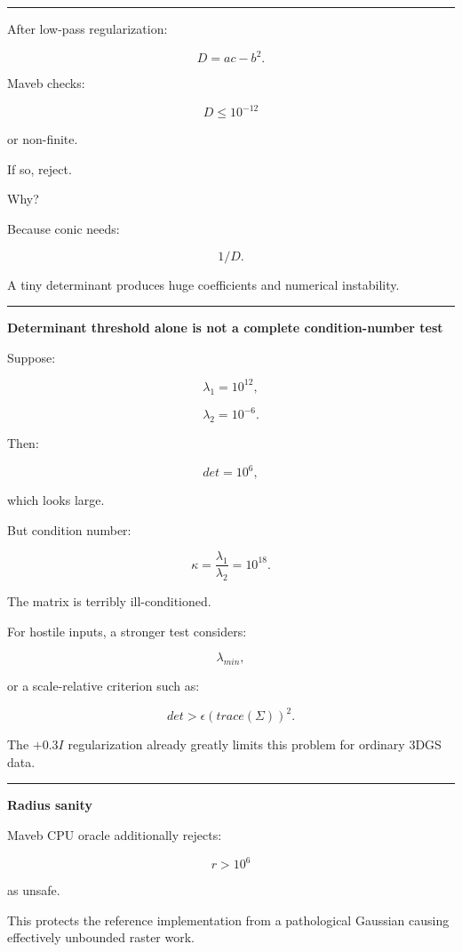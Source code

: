 \begin{center}\rule{0.5\linewidth}{0.5pt}\end{center}

After low-pass regularization:

\[
D=
ac-b^2.
\]

Maveb checks:

\[
D\le10^{-12}
\]

or non-finite.

If so, reject.

Why?

Because conic needs:

\[
1/D.
\]

A tiny determinant produces huge coefficients and numerical instability.

\begin{center}\rule{0.5\linewidth}{0.5pt}\end{center}

\textbf{Determinant threshold alone is not a complete condition-number test}

Suppose:

\[
\lambda_1=10^{12},
\]

\[
\lambda_2=10^{-6}.
\]

Then:

\[
det=
10^6,
\]

which looks large.

But condition number:

\[
\kappa=
\frac{\lambda_1}{\lambda_2}
=
10^{18}.
\]

The matrix is terribly ill-conditioned.

For hostile inputs, a stronger test considers:

\[
\lambda_{min},
\]

or a scale-relative criterion such as:

\[
\boxed{
det
>
\epsilon
(trace(\Sigma))^2.
}
\]

The \(+0.3I\) regularization already greatly limits this problem for ordinary 3DGS data.

\begin{center}\rule{0.5\linewidth}{0.5pt}\end{center}

\textbf{Radius sanity}

Maveb CPU oracle additionally rejects:

\[
r>10^6
\]

as unsafe.

This protects the reference implementation from a pathological Gaussian causing effectively unbounded raster work.

